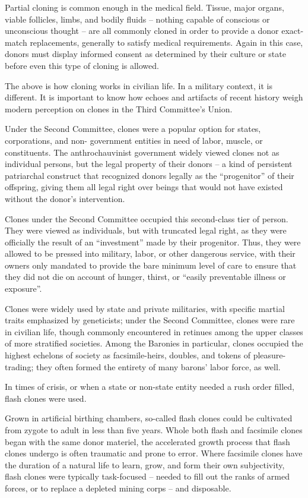Partial cloning is common enough in the medical field. Tissue, major organs, viable follicles,
limbs, and bodily fluids -- nothing capable of conscious or unconscious thought -- are all
commonly cloned in order to provide a donor exact-match replacements, generally to satisfy
medical requirements. Again in this case, donors must display informed consent as determined
by their culture or state before even this type of cloning is allowed.


The above is how cloning works in civilian life. In a military context, it is different. It is important
to know how echoes and artifacts of recent history weigh modern perception on clones in the
Third Committee’s Union.


Under the Second Committee, clones were a popular option for states, corporations, and non-
government entities in need of labor, muscle, or constituents. The anthrochauvinist government
widely viewed clones not as individual persons, but the legal property of their donors -- a kind of
persistent patriarchal construct that recognized donors legally as the “progenitor” of their
offspring, giving them all legal right over beings that would not have existed without the donor’s
intervention.


Clones under the Second Committee occupied this second-class tier of person. They were
viewed as individuals, but with truncated legal right, as they were officially the result of an
“investment” made by their progenitor. Thus, they were allowed to be pressed into military, labor,
or other dangerous service, with their owners only mandated to provide the bare minimum level
of care to ensure that they did not die on account of hunger, thirst, or “easily preventable illness
or exposure”.





Clones were widely used by state and private militaries, with specific martial traits emphasized
by geneticists; under the Second Committee, clones were rare in civilian life, though commonly
encountered in retinues among the upper classes of more stratified societies. Among the
Baronies in particular, clones occupied the highest echelons of society as facsimile-heirs,
doubles, and tokens of pleasure-trading; they often formed the entirety of many barons’ labor
force, as well.


In times of crisis, or when a state or non-state entity needed a rush order filled, flash clones were
used.


Grown in artificial birthing chambers, so-called flash clones could be cultivated from zygote to
adult in less than five years. Whole both flash and facsimile clones began with the same donor
materiel, the accelerated growth process that flash clones undergo is often traumatic and prone
to error. Where facsimile clones have the duration of a natural life to learn, grow, and form their
own subjectivity, flash clones were typically task-focused -- needed to fill out the ranks of armed
forces, or to replace a depleted mining corps -- and disposable.


